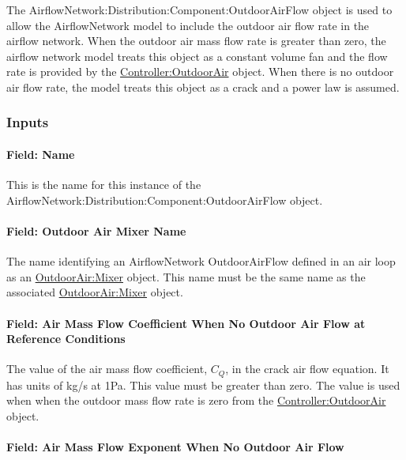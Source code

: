 The AirflowNetwork:Distribution:Component:OutdoorAirFlow object is used to allow the AirflowNetwork model to include the outdoor air flow rate in the airflow network. When the outdoor air mass flow rate is greater than zero, the airflow network model treats this object as a constant volume fan and the flow rate is provided by the \hyperref[controlleroutdoorair]{Controller:OutdoorAir} object. When there is no outdoor air flow rate, the model treats this object as a crack and a power law is assumed.

\subsubsection{Inputs}\label{inputs-AFN-outdoorairflow}

\paragraph{Field: Name}\label{field-name-outdoorairflow}

This is the name for this instance of the AirflowNetwork:Distribution:Component:OutdoorAirFlow object.

\paragraph{Field: Outdoor Air Mixer Name}

The name identifying an AirflowNetwork OutdoorAirFlow defined in an air loop as an \hyperref[outdoorairmixer]{OutdoorAir:Mixer} object. This name must be the same name as the associated \hyperref[outdoorairmixer]{OutdoorAir:Mixer} object.

\paragraph{Field: Air Mass Flow Coefficient When No Outdoor Air Flow at Reference Conditions}\label{field-air-mass-flow-coefficient-when-no-outdoor-air-flow-at-reference-conditions}

The value of the air mass flow coefficient, \({C_Q}\), in the crack air flow equation. It has units of kg/s at 1Pa. This value must be greater than zero. The value is used when when the outdoor mass flow rate is zero from the \hyperref[controlleroutdoorair]{Controller:OutdoorAir} object.

\paragraph{Field: Air Mass Flow Exponent When No Outdoor Air Flow}\label{field-air-mass-flow-exponent-when-no-outdoor-air-flow}

